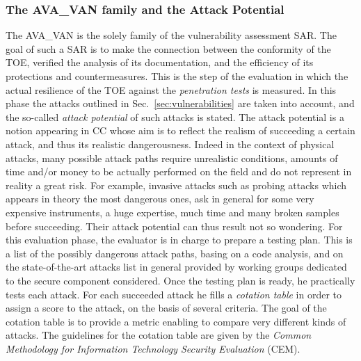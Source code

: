 \subsubsection{The AVA\_VAN family and the Attack Potential}
The AVA\_VAN is the solely family of the vulnerability assessment SAR. The goal of such a SAR is to make the connection between the conformity of the TOE, verified \via the analysis of its documentation, and the efficiency of its protections and countermeasures. This is the step of the evaluation in which the actual resilience of the TOE against the \emph{penetration tests} is measured. In this phase the attacks outlined in Sec.~\ref{sec:vulnerabilities} are taken into account, and the so-called \emph{attack potential} of such attacks is stated. The attack potential is a notion appearing in CC whose aim is to reflect the realism of succeeding a certain attack, and thus its realistic dangerousness. Indeed in the context of physical attacks, many possible attack paths require unrealistic conditions, amounts of time and/or money to be actually performed on the field and do not represent in reality a great risk. For example, invasive attacks such as probing attacks which appears in theory the most dangerous ones, ask in general for some very expensive instruments, a huge expertise, much time and many broken samples before succeeding. Their attack potential can thus result not so wondering. For this evaluation phase, the evaluator is in charge to prepare a testing plan. This is a list of the possibly dangerous attack paths, basing on a code analysis, and on the state-of-the-art attacks list in general provided by working groups dedicated to the secure component considered. Once the testing plan is ready, he practically tests each attack. For each succeeded attack he fills a \emph{cotation table} in order to assign a score to the attack, on the basis of several criteria. The goal of the cotation table is to provide a metric enabling to compare very different kinds of attacks. The guidelines for the cotation table are given by the \emph{Common Methodology for Information Technology Security Evaluation} (CEM). \\

